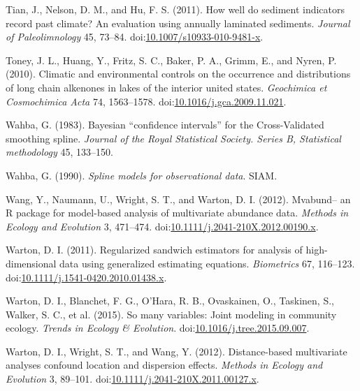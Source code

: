 \documentclass[12pt,]{article}
\begin{document}
\hypertarget{ref-Tian2011-ip}{}
Tian, J., Nelson, D. M., and Hu, F. S. (2011). How well do sediment
indicators record past climate? An evaluation using annually laminated
sediments. \emph{Journal of Paleolimnology} 45, 73--84.
doi:\href{https://doi.org/10.1007/s10933-010-9481-x}{10.1007/s10933-010-9481-x}.

\hypertarget{ref-Toney2010-ba}{}
Toney, J. L., Huang, Y., Fritz, S. C., Baker, P. A., Grimm, E., and
Nyren, P. (2010). Climatic and environmental controls on the occurrence
and distributions of long chain alkenones in lakes of the interior
united states. \emph{Geochimica et Cosmochimica Acta} 74, 1563--1578.
doi:\href{https://doi.org/10.1016/j.gca.2009.11.021}{10.1016/j.gca.2009.11.021}.

\hypertarget{ref-Wahba1983-eh}{}
Wahba, G. (1983). Bayesian ``confidence intervals'' for the
Cross-Validated smoothing spline. \emph{Journal of the Royal Statistical
Society. Series B, Statistical methodology} 45, 133--150.

\hypertarget{ref-Wahba1990-ag}{}
Wahba, G. (1990). \emph{Spline models for observational data}. SIAM.

\hypertarget{ref-Wang2012-uu}{}
Wang, Y., Naumann, U., Wright, S. T., and Warton, D. I. (2012).
Mvabund-- an R package for model-based analysis of multivariate
abundance data. \emph{Methods in Ecology and Evolution} 3, 471--474.
doi:\href{https://doi.org/10.1111/j.2041-210X.2012.00190.x}{10.1111/j.2041-210X.2012.00190.x}.

\hypertarget{ref-Warton2011-vp}{}
Warton, D. I. (2011). Regularized sandwich estimators for analysis of
high-dimensional data using generalized estimating equations.
\emph{Biometrics} 67, 116--123.
doi:\href{https://doi.org/10.1111/j.1541-0420.2010.01438.x}{10.1111/j.1541-0420.2010.01438.x}.

\hypertarget{ref-Warton2015-ge}{}
Warton, D. I., Blanchet, F. G., O'Hara, R. B., Ovaskainen, O., Taskinen,
S., Walker, S. C., et al. (2015). So many variables: Joint modeling in
community ecology. \emph{Trends in Ecology \& Evolution}.
doi:\href{https://doi.org/10.1016/j.tree.2015.09.007}{10.1016/j.tree.2015.09.007}.

\hypertarget{ref-Warton2012-fg}{}
Warton, D. I., Wright, S. T., and Wang, Y. (2012). Distance-based
multivariate analyses confound location and dispersion effects.
\emph{Methods in Ecology and Evolution} 3, 89--101.
doi:\href{https://doi.org/10.1111/j.2041-210X.2011.00127.x}{10.1111/j.2041-210X.2011.00127.x}.
\end{document}
